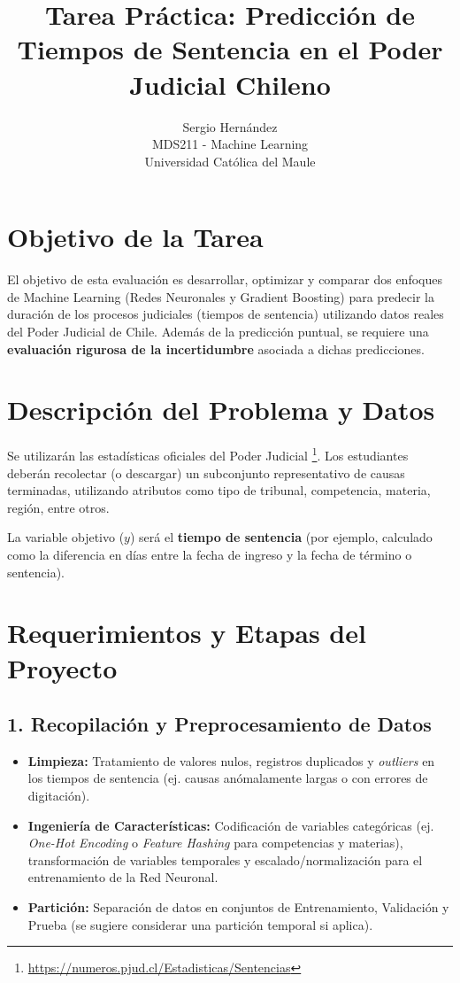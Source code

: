 \documentclass[11pt,a4paper]{article}
\title{\vspace{-2cm}\color{ucmblue}\textbf{Tarea Práctica: Predicción de Tiempos de Sentencia en el Poder Judicial Chileno}}
\author{Sergio Hernández\\MDS211 - Machine Learning\\Universidad Católica del Maule}
\date{}
\begin{document}
\maketitle

\section{Objetivo de la Tarea}
El objetivo de esta evaluación es desarrollar, optimizar y comparar dos enfoques de Machine Learning (Redes Neuronales y Gradient Boosting) para predecir la duración de los procesos judiciales (tiempos de sentencia) utilizando datos reales del Poder Judicial de Chile. Además de la predicción puntual, se requiere una \textbf{evaluación rigurosa de la incertidumbre} asociada a dichas predicciones.

\section{Descripción del Problema y Datos}
Se utilizarán las estadísticas oficiales del Poder Judicial \footnote{\url{https://numeros.pjud.cl/Estadisticas/Sentencias}}. Los estudiantes deberán recolectar (o descargar) un subconjunto representativo de causas terminadas, utilizando atributos como tipo de tribunal, competencia, materia, región, entre otros.

La variable objetivo ($y$) será el \textbf{tiempo de sentencia} (por ejemplo, calculado como la diferencia en días entre la fecha de ingreso y la fecha de término o sentencia).

\section{Requerimientos y Etapas del Proyecto}

\subsection{1. Recopilación y Preprocesamiento de Datos}
\begin{itemize}
    \item \textbf{Limpieza:} Tratamiento de valores nulos, registros duplicados y \textit{outliers} en los tiempos de sentencia (ej. causas anómalamente largas o con errores de digitación).
    \item \textbf{Ingeniería de Características:} Codificación de variables categóricas (ej. \textit{One-Hot Encoding} o \textit{Feature Hashing} para competencias y materias), transformación de variables temporales y escalado/normalización para el entrenamiento de la Red Neuronal.
    \item \textbf{Partición:} Separación de datos en conjuntos de Entrenamiento, Validación y Prueba (se sugiere considerar una partición temporal si aplica).
\end{itemize}
\end{document}
